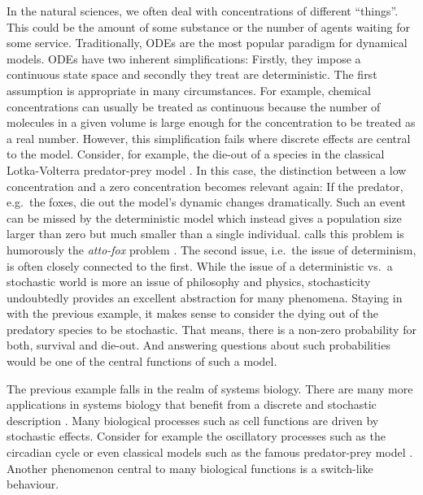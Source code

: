 In the natural sciences, we often deal with concentrations of different ``things''.
This could be the amount of some substance or the number of agents waiting for some service.
Traditionally, \aclp{ODE} are the most popular paradigm for dynamical models.
\Aclp{ODE} have two inherent simplifications: Firstly, they impose a continuous state space and secondly they treat are deterministic.
The first assumption is appropriate in many circumstances.
For example, chemical concentrations can usually be treated as continuous because the number of molecules in a given volume is large enough for the concentration to be treated as a real number.
However, this simplification fails where discrete effects are central to the model.
Consider, for example, the die-out of a species in the classical Lotka-Volterra predator-prey model \parencite{lotka1925elements}.
In this case, the distinction between a low concentration and a zero concentration becomes relevant again:
If the predator, e.g.\ the foxes, die out the model's dynamic changes dramatically.
Such an event can be missed by the deterministic model which instead gives a population size larger than zero but much smaller than a single individual.
 calls this problem is humorously the \emph{atto-fox} problem \parencite{mollison1991dependence}.
The second issue, i.e.\ the issue of determinism, is often closely connected to the first.
While the issue of a deterministic vs.\ a stochastic world is more an issue of philosophy and physics, stochasticity undoubtedly provides an excellent abstraction for many phenomena.
Staying in with the previous example, it makes sense to consider the dying out of the predatory species to be stochastic.
That means, there is a non-zero probability for both, survival and die-out.
And answering questions about such probabilities would be one of the central functions of such a model.

The previous example falls in the realm of systems biology.
There are many more applications in systems biology that benefit from a discrete and stochastic description \parencite{wilkinson2018stochastic,BuchWolkenhauer}.
Many biological processes such as cell functions are driven by stochastic effects.
Consider for example the oscillatory processes such as the circadian cycle \parencite{asgari2019mathematical} or even classical models such as the famous predator-prey model \parencite{lotka1925elements}.
Another phenomenon central to many biological functions is a switch-like behaviour.


